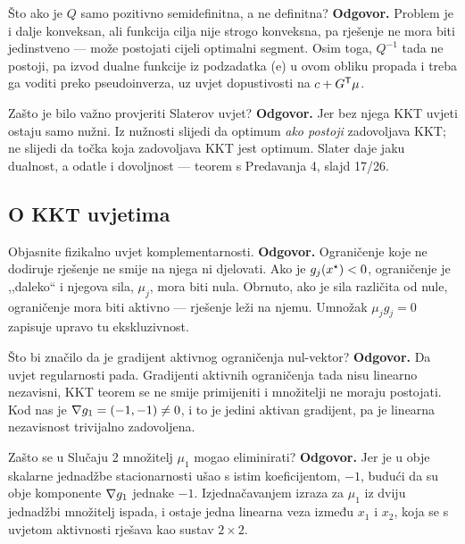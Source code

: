 \begin{pitanje}{Što ako je $Q$ samo pozitivno semidefinitna, a ne definitna?}
\textbf{Odgovor.} Problem je i dalje konveksan, ali funkcija cilja nije strogo
konveksna, pa rješenje ne mora biti jedinstveno --- može postojati cijeli
optimalni segment. Osim toga, $Q^{-1}$ tada ne postoji, pa izvod dualne funkcije
iz podzadatka (e) u ovom obliku propada i treba ga voditi preko pseudoinverza,
uz uvjet dopustivosti na $c + G^{\mathsf{T}}\mu$.
\end{pitanje}

\begin{pitanje}{Zašto je bilo važno provjeriti Slaterov uvjet?}
\textbf{Odgovor.} Jer bez njega KKT uvjeti ostaju samo nužni. Iz nužnosti slijedi
da optimum \emph{ako postoji} zadovoljava KKT; ne slijedi da točka koja
zadovoljava KKT jest optimum. Slater daje jaku dualnost, a odatle i dovoljnost ---
teorem s Predavanja 4, slajd 17/26.
\end{pitanje}

\subsection{O KKT uvjetima}

\begin{pitanje}{Objasnite fizikalno uvjet komplementarnosti.}
\textbf{Odgovor.} Ograničenje koje ne dodiruje rješenje ne smije na njega ni
djelovati. Ako je $g_j(x^{\star}) < 0$, ograničenje je ,,daleko`` i njegova sila,
$\mu_j$, mora biti nula. Obrnuto, ako je sila različita od nule, ograničenje mora
biti aktivno --- rješenje leži na njemu. Umnožak $\mu_j g_j = 0$ zapisuje upravo
tu ekskluzivnost.
\end{pitanje}

\begin{pitanje}{Što bi značilo da je gradijent aktivnog ograničenja nul-vektor?}
\textbf{Odgovor.} Da uvjet regularnosti pada. Gradijenti aktivnih ograničenja
tada nisu linearno nezavisni, KKT teorem se ne smije primijeniti i množitelji ne
moraju postojati. Kod nas je $\nabla g_1 = (-1,-1) \neq 0$, i to je jedini aktivan
gradijent, pa je linearna nezavisnost trivijalno zadovoljena.
\end{pitanje}

\begin{pitanje}{Zašto se u Slučaju 2 množitelj $\mu_1$ mogao eliminirati?}
\textbf{Odgovor.} Jer je u obje skalarne jednadžbe stacionarnosti ušao s istim
koeficijentom, $-1$, budući da su obje komponente $\nabla g_1$ jednake $-1$.
Izjednačavanjem izraza za $\mu_1$ iz dviju jednadžbi množitelj ispada, i ostaje
jedna linearna veza između $x_1$ i $x_2$, koja se s uvjetom aktivnosti rješava
kao sustav $2\times2$.
\end{pitanje}

